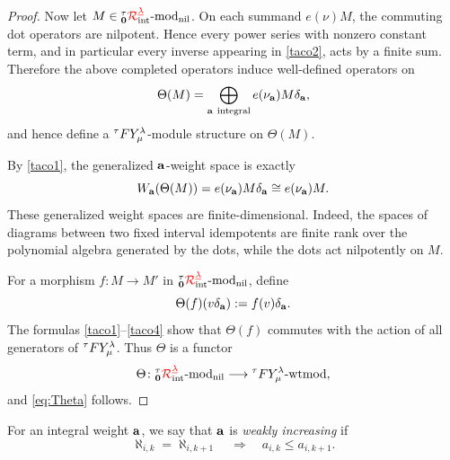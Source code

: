 \begin{proof}
Now let \(M\in{{}^\tau_{\mathbf{0}}{\color{red}\mathcal{R}}^{{{\color{red}\underline{\lambda}}}}_{\text{int}}}\text{-mod}_{\text{nil}}\). On each summand \(e(\nu)M\), the commuting
dot operators are nilpotent. Hence every power series with nonzero
constant term, and in particular every inverse appearing in
\cref{taco2}, acts by a finite sum. Therefore the above completed
operators induce well-defined operators on
\[
\Theta(M)
=
\bigoplus_{\mathbf{a}\ \mathrm{integral}}
e(\nu_{\mathbf{a}})M\delta_{\mathbf{a}},
\]
and hence define a \({}^\tau F Y_\mu^\lambda\)-module structure on \(\Theta(M)\).

By \cref{taco1}, the generalized \(\mathbf{a}\)-weight space is exactly
\[
W_{\mathbf{a}}(\Theta(M))
=
e(\nu_{\mathbf{a}})M\delta_{\mathbf{a}}
\cong e(\nu_{\mathbf{a}})M.
\]
These generalized weight spaces are finite-dimensional. Indeed, the
spaces of diagrams between two fixed interval idempotents are finite
rank over the polynomial algebra generated by the dots, while the dots
act nilpotently on \(M\).



For a morphism \(f\colon M\to M'\) in \({{}^\tau_{\mathbf{0}}{\color{red}\mathcal{R}}^{{{\color{red}\underline{\lambda}}}}_{\text{int}}}\text{-mod}_{\text{nil}}\), define
\[
\Theta(f)(v\delta_{\mathbf{a}}):=f(v)\delta_{\mathbf{a}}.
\]
The formulas \cref{taco1}--\cref{taco4} show that \(\Theta(f)\) commutes with the action of
all generators of \({}^\tau F Y_\mu^\lambda\). Thus \(\Theta\) is a functor
\[
\Theta\colon{{}^\tau_{\mathbf{0}}{\color{red}\mathcal{R}}^{{{\color{red}\underline{\lambda}}}}_{\text{int}}}\text{-mod}_{\text{nil}}\longrightarrow{}^\tau F Y_\mu^\lambda\text{-wtmod},
\]
and \cref{eq:Theta} follows.
\end{proof}



For an integral weight \(\mathbf{a}\), we say that \(\mathbf{a}\) is \emph{weakly increasing} if
\[
   \aleph_{i,k}=\aleph_{i,k+1}
   \quad\Longrightarrow\quad
   a_{i,k}\leq a_{i,k+1}.
\]

